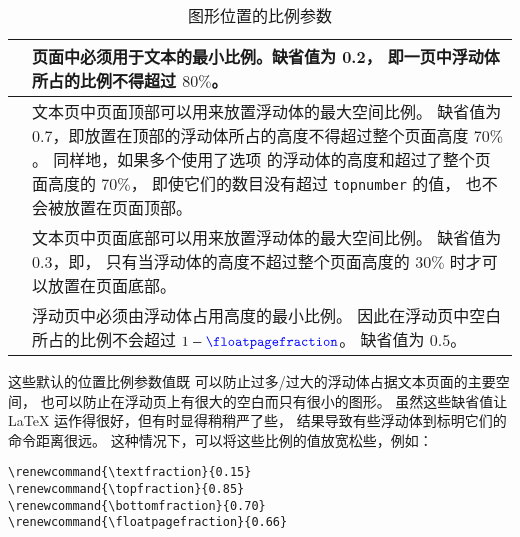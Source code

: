 \begin{table}[hbp]
	\centering
	\caption{图形位置的比例参数}\label{tab:floatfraction}
	\begin{tabular}{ l p{}}
		\toprule
		\cmd{textfraction} & 页面中必须用于文本的最小比例。缺省值为 0.2，
		即一页中浮动体所占的比例不得超过 $80\percent$。 \\
		\hline
		\cmd{topfraction} &  文本页中页面顶部可以用来放置浮动体的最大空间比例。
		缺省值为 $0.7$，即放置在顶部的浮动体所占的高度不得超过整个页面高度 $70\percent$。
		同样地，如果多个使用了选项 \opt{t} 的浮动体的高度和超过了整个页面高度的 $70\percent$，
		即使它们的数目没有超过 \texttt{topnumber} 的值，
		也不会被放置在页面顶部。 \\
		\hline
		\cmd{bottomfraction} & 文本页中页面底部可以用来放置浮动体的最大空间比例。
		缺省值为 $0.3$，即，
		只有当浮动体的高度不超过整个页面高度的 $30\percent$ 时才可以放置在页面底部。\\
		\hline
		\cmd{floatpagefraction} & 浮动页中必须由浮动体占用高度的最小比例。
		因此在浮动页中空白所占的比例不会超过 $1-\text{\cmd{floatpagefraction}}$。
		缺省值为 $0.5$。\\
		\bottomrule
	\end{tabular}
\end{table}

这些默认的位置比例参数值既
可以防止过多/过大的浮动体占据文本页面的主要空间，
也可以防止在浮动页上有很大的空白而只有很小的图形。
虽然这些缺省值让 \LaTeX{} 运作得很好，但有时显得稍稍严了些，
结果导致有些浮动体到标明它们的命令距离很远。
这种情况下，可以将这些比例的值放宽松些，例如：
\begin{lstlisting}
\renewcommand{\textfraction}{0.15} 
\renewcommand{\topfraction}{0.85} 
\renewcommand{\bottomfraction}{0.70} 
\renewcommand{\floatpagefraction}{0.66}
\end{lstlisting}

